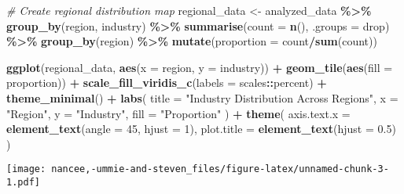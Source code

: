 \documentclass[
]{article}
\newenvironment{Shaded}{\begin{snugshade}}{\end{snugshade}}
\newcommand{\AttributeTok}[1]{\textcolor[rgb]{0.13,0.29,0.53}{#1}}
\newcommand{\CommentTok}[1]{\textcolor[rgb]{0.56,0.35,0.01}{\textit{#1}}}
\newcommand{\DecValTok}[1]{\textcolor[rgb]{0.00,0.00,0.81}{#1}}
\newcommand{\FloatTok}[1]{\textcolor[rgb]{0.00,0.00,0.81}{#1}}
\newcommand{\FunctionTok}[1]{\textcolor[rgb]{0.13,0.29,0.53}{\textbf{#1}}}
\newcommand{\NormalTok}[1]{#1}
\newcommand{\OtherTok}[1]{\textcolor[rgb]{0.56,0.35,0.01}{#1}}
\newcommand{\SpecialCharTok}[1]{\textcolor[rgb]{0.81,0.36,0.00}{\textbf{#1}}}
\newcommand{\StringTok}[1]{\textcolor[rgb]{0.31,0.60,0.02}{#1}}
\begin{document}
\begin{Shaded}
\begin{Highlighting}[]
\CommentTok{\# Create regional distribution map}
\NormalTok{regional\_data }\OtherTok{\textless{}{-}}\NormalTok{ analyzed\_data }\SpecialCharTok{\%\textgreater{}\%}
  \FunctionTok{group\_by}\NormalTok{(region, industry) }\SpecialCharTok{\%\textgreater{}\%}
  \FunctionTok{summarise}\NormalTok{(}\AttributeTok{count =} \FunctionTok{n}\NormalTok{(), }\AttributeTok{.groups =} \StringTok{\textquotesingle{}drop\textquotesingle{}}\NormalTok{) }\SpecialCharTok{\%\textgreater{}\%}
  \FunctionTok{group\_by}\NormalTok{(region) }\SpecialCharTok{\%\textgreater{}\%}
  \FunctionTok{mutate}\NormalTok{(}\AttributeTok{proportion =}\NormalTok{ count}\SpecialCharTok{/}\FunctionTok{sum}\NormalTok{(count))}

\FunctionTok{ggplot}\NormalTok{(regional\_data, }\FunctionTok{aes}\NormalTok{(}\AttributeTok{x =}\NormalTok{ region, }\AttributeTok{y =}\NormalTok{ industry)) }\SpecialCharTok{+}
  \FunctionTok{geom\_tile}\NormalTok{(}\FunctionTok{aes}\NormalTok{(}\AttributeTok{fill =}\NormalTok{ proportion)) }\SpecialCharTok{+}
  \FunctionTok{scale\_fill\_viridis\_c}\NormalTok{(}\AttributeTok{labels =}\NormalTok{ scales}\SpecialCharTok{::}\NormalTok{percent) }\SpecialCharTok{+}
  \FunctionTok{theme\_minimal}\NormalTok{() }\SpecialCharTok{+}
  \FunctionTok{labs}\NormalTok{(}
    \AttributeTok{title =} \StringTok{"Industry Distribution Across Regions"}\NormalTok{,}
    \AttributeTok{x =} \StringTok{"Region"}\NormalTok{,}
    \AttributeTok{y =} \StringTok{"Industry"}\NormalTok{,}
    \AttributeTok{fill =} \StringTok{"Proportion"}
\NormalTok{  ) }\SpecialCharTok{+}
  \FunctionTok{theme}\NormalTok{(}
    \AttributeTok{axis.text.x =} \FunctionTok{element\_text}\NormalTok{(}\AttributeTok{angle =} \DecValTok{45}\NormalTok{, }\AttributeTok{hjust =} \DecValTok{1}\NormalTok{),}
    \AttributeTok{plot.title =} \FunctionTok{element\_text}\NormalTok{(}\AttributeTok{hjust =} \FloatTok{0.5}\NormalTok{)}
\NormalTok{  )}
\end{Highlighting}
\end{Shaded}

\texttt{[image: nancee,-ummie-and-steven\_files/figure-latex/unnamed-chunk-3-1.pdf]}
\end{document}
